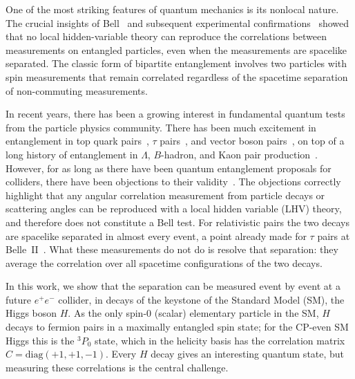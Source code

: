 \documentclass[%
 reprint,
 amsmath,amssymb,
 aps
]{revtex4-2}
\newcommand{\ee}{e^+e^-}
\begin{document}
One of the most striking features of quantum mechanics is its nonlocal nature. The crucial insights of Bell~\cite{Bell:1964kc} and subsequent experimental confirmations~\cite{Aspect:1981nv,Tittel:1997bi,new_test} showed that no local hidden-variable theory can reproduce the correlations between measurements on entangled particles, even when the measurements are spacelike separated. The classic form of bipartite entanglement involves two particles with spin measurements that remain correlated regardless of the spacetime separation of non-commuting measurements.

In recent years, there has been a growing interest in fundamental quantum tests from the particle physics community. There has been much excitement in entanglement in top quark pairs~\cite{Afik:2020onf,Fabbrichesi:2021npl,Severi:2021cnj,Dong:2023xiw,Han:2023fci,White:2024nuc,ATLAS:2023fsd,CMS:2024pts}, $\tau$ pairs~\cite{Yang:2026uwu,Han:2025ewp,Altakach:2022ywa,Ehataht:2023zzt,Ma:2023yvd,Gabrielli:2026tnl}, and vector boson pairs~\cite{Aoude:2023hxv,Aguilar-Saavedra:2022mpg,Aguilar-Saavedra:2022wam,Gabrielli:2026tnl}, on top of a long history of entanglement in $\Lambda$, $B$-hadron, and Kaon pair production~\cite{Hao:2009kj,Pei:2025yvr,Faldt:2013gka,Afik:2025grr,Gisin:2000jn}. However, for as long as there have been quantum entanglement proposals for colliders, there have been objections to their validity~\cite{Abel:1992kz,Dreiner:1992gt,Abel:2025skj,Bechtle:2025ugc}. The objections correctly highlight that any angular correlation measurement from particle decays or scattering angles can be reproduced with a local hidden variable (LHV) theory, and therefore does not constitute a Bell test. For relativistic pairs the two decays are spacelike separated in almost every event, a point already made for $\tau$ pairs at Belle~II~\cite{Ehataht:2023zzt}. What these measurements do not do is resolve that separation: they average the correlation over all spacetime configurations of the two decays.

In this work, we show that the separation can be measured event by event at a future $\ee$ collider, in decays of the keystone of the Standard Model (SM), the Higgs boson $H$. As the only spin-0 (scalar) elementary particle in the SM, $H$ decays to fermion pairs in a maximally entangled spin state; for the CP-even SM Higgs this is the $^3P_0$ state, which in the helicity basis has the correlation matrix $C=\mathrm{diag}(+1,+1,-1)$. Every $H$ decay gives an interesting quantum state, but measuring these correlations is the central challenge.
\end{document}
